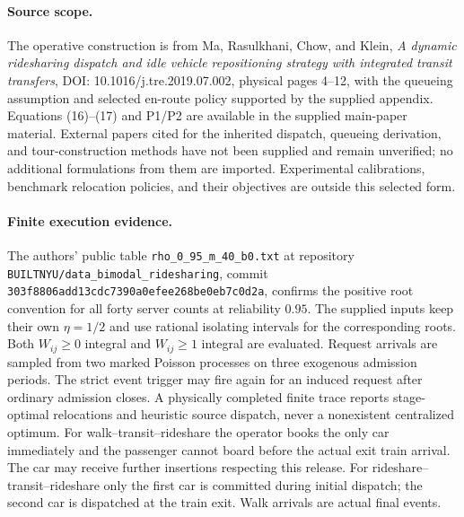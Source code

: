 \documentclass{article}
\begin{document}
\paragraph{Source scope.}
The operative construction is from Ma, Rasulkhani, Chow, and Klein, \emph{A dynamic ridesharing dispatch and idle vehicle repositioning strategy with integrated transit transfers}, DOI: 10.1016/j.tre.2019.07.002, physical pages 4--12, with the queueing assumption and selected en-route policy supported by the supplied appendix. Equations (16)--(17) and P1/P2 are available in the supplied main-paper material. External papers cited for the inherited dispatch, queueing derivation, and tour-construction methods have not been supplied and remain unverified; no additional formulations from them are imported. Experimental calibrations, benchmark relocation policies, and their objectives are outside this selected form.


\paragraph{Finite execution evidence.}
The authors' public table \texttt{rho\_0\_95\_m\_40\_b0.txt} at repository
\texttt{BUILTNYU/data\_bimodal\_ridesharing}, commit
\texttt{303f8806add13cdc7390a0efee268be0eb7c0d2a}, confirms the positive
root convention for all forty server counts at reliability \(0.95\).
The supplied inputs keep their own \(\eta=1/2\) and use rational isolating
intervals for the corresponding roots. Both \(W_{ij}\ge0\) integral and
\(W_{ij}\ge1\) integral are evaluated. Request arrivals are sampled from
two marked Poisson processes on three exogenous admission periods. The
strict event trigger may fire again for an induced request after ordinary
admission closes. A physically completed finite trace reports stage-optimal
relocations and heuristic source dispatch, never a nonexistent centralized optimum.
For walk--transit--rideshare the operator books the only car immediately and
the passenger cannot board before the actual exit train arrival. The car may
receive further insertions respecting this release. For rideshare--transit--rideshare
only the first car is committed during initial dispatch; the second car is
dispatched at the train exit. Walk arrivals are actual final events.
\end{document}
